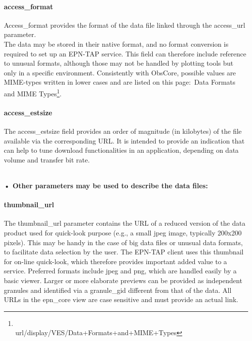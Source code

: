 \documentclass[11pt,a4paper]{ivoa}
\begin{document}
\paragraph{access\_format}

Access\_format provides the format of the data file linked through the access\_url parameter. \\The data may be stored in their native format, and no format conversion is required to set up an EPN-TAP service. This field can therefore include reference to unusual formats, although those may not be handled by plotting tools but only in a specific environment. Consistently with ObsCore, possible values are MIME-types written in lower cases and are listed on this page: Data Formats and MIME Types\footnote{\\url{/display/VES/Data+Formats+and+MIME+Types}}.

\paragraph{access\_estsize}

The access\_estsize field provides an order of magnitude (in kilobytes) of the file available via the corresponding URL. It is intended to provide an indication that can help to tune download functionalities in an application, depending on data volume and transfer bit rate.

\\

\textbf{• Other parameters may be used to describe the data files:}

\paragraph{thumbnail\_url}

The thumbnail\_url parameter contains the URL of a reduced version of the data product used for quick-look purpose (e.g., a small jpeg image, typically 200x200 pixels). This may be handy in the case of big data files or unusual data formats, to facilitate data selection by the user. The EPN-TAP client uses this thumbnail for on-line quick-look, which therefore provides important added value to a service. Preferred formats include jpeg and png, which are handled easily by a basic viewer. Larger or more elaborate previews can be provided as independent granules and identified via a granule\_gid different from that of the data. All URLs in the epn\_core view are case sensitive and must provide an actual link.
\end{document}

